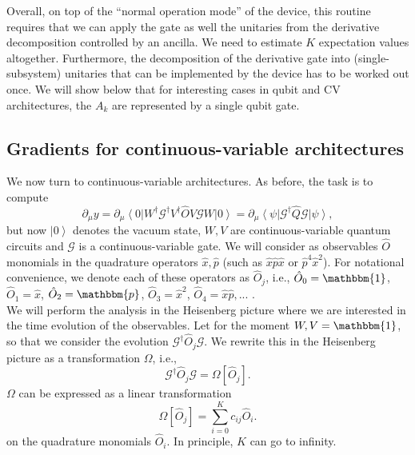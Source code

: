 \documentclass[aps,pra,10pt,twocolumn,groupedaddress,nofootinbib]{revtex4-1}
\theoremstyle{plain}
\newcommand{\ket}[1]{\ensuremath{\left| #1 \right \rangle}}
\newcommand{\bra}[1]{\ensuremath{\left \langle #1 \right |}}
\newcommand{\x}{\hat{x}}
\newcommand{\p}{\hat{p}}
\newcommand{\G}{\mathcal{G}}
\begin{document}
Overall, on top of the ``normal operation mode'' of the device, this routine requires that we can apply the gate as well the unitaries from the derivative decomposition controlled by an ancilla. We need to estimate $K$ expectation values altogether. Furthermore, the decomposition of the derivative gate into (single-subsystem)  unitaries that can be implemented by the device has to be worked out once. We will show below that for interesting cases in qubit and CV architectures, the $A_k$ are represented by a single qubit gate.


\subsection{Gradients for continuous-variable architectures}

We now turn to continuous-variable architectures. As before, the task is to compute 
\[\partial_{\mu}y = \partial_{\mu} \bra{0}W^{\dagger} \G^{\dagger} V^{\dagger} \hat{O}V \G W \ket{0} = \partial_{\mu} \bra{\psi} \G^{\dagger} \hat{Q} \G \ket{\psi},  \]
but now  $\ket{0}$ denotes the vacuum state, $W, V$ are continuous-variable quantum circuits and $\G$ is a continuous-variable gate. We will consider as observables $\hat{O}$ monomials in the quadrature operators $\x, \p$ (such as $\x \p \x$ or $\p^4 \x^2$). For notational convenience, we denote each of these operators as $\hat{O}_j$, i.e., $\hat{O}_0 = \mathbbm{1}$, $\hat{O}_1 = \x$, $\hat{O}_2 = \mathbbm{p}$, $\hat{O}_3 = \x^2$, $\hat{O}_4 = \x \p,...$ .\\

We will perform the analysis in the Heisenberg picture where we are interested in the time  evolution of the observables. Let for the moment $W,V=\mathbbm{1}$, so that we consider the evolution $\G^{\dagger} \hat{O}_j \G$. We rewrite this in the Heisenberg picture as a transformation $\Omega$, i.e.,
\begin{equation}
 \mathcal{G}^\dagger \hat{O}_j \mathcal{G} = \Omega[\hat{O}_j].
\end{equation}
$\Omega$ can be expressed as a linear transformation
\begin{equation}
 \Omega[\hat{O}_j] = \sum_{i=0}^{K} c_{ij} \hat{O}_i.
\end{equation}
on the quadrature monomials $\hat{O}_i$. In principle, $K$ can go to infinity.
 
\end{document}
